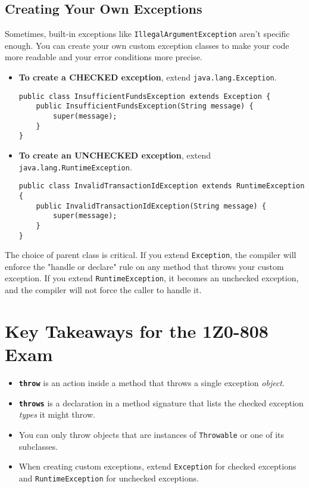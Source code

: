 \documentclass[12pt]{article}
\begin{document}
\begin{enumerate}[label=(\arabic*)]
\subsection{Creating Your Own Exceptions}
Sometimes, built-in exceptions like \texttt{IllegalArgumentException} aren't specific enough. You can create your own custom exception classes to make your code more readable and your error conditions more precise.
\begin{itemize}
    \item \textbf{To create a CHECKED exception}, extend \texttt{java.lang.Exception}.
\begin{verbatim}
public class InsufficientFundsException extends Exception {
    public InsufficientFundsException(String message) {
        super(message);
    }
}
\end{verbatim}
    \item \textbf{To create an UNCHECKED exception}, extend \texttt{java.lang.RuntimeException}.
\begin{verbatim}
public class InvalidTransactionIdException extends RuntimeException {
    public InvalidTransactionIdException(String message) {
        super(message);
    }
}
\end{verbatim}
\end{itemize}
The choice of parent class is critical. If you extend \texttt{Exception}, the compiler will enforce the "handle or declare" rule on any method that throws your custom exception. If you extend \texttt{RuntimeException}, it becomes an unchecked exception, and the compiler will not force the caller to handle it.

\section*{Key Takeaways for the 1Z0-808 Exam}
\begin{itemize}
    \item \textbf{\texttt{throw}} is an action inside a method that throws a single exception \textit{object}.
    \item \textbf{\texttt{throws}} is a declaration in a method signature that lists the checked exception \textit{types} it might throw.
    \item You can only throw objects that are instances of \texttt{Throwable} or one of its subclasses.
    \item When creating custom exceptions, extend \texttt{Exception} for checked exceptions and \texttt{RuntimeException} for unchecked exceptions.
\end{itemize}
\end{enumerate}
\end{document}
